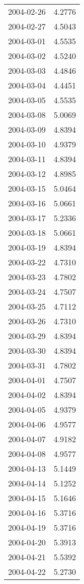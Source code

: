 \begin{tabular}{lr}
2004-02-26 &      4.2776 \\
2004-02-27 &      4.5043 \\
2004-03-01 &      4.5535 \\
2004-03-02 &      4.5240 \\
2004-03-03 &      4.4846 \\
2004-03-04 &      4.4451 \\
2004-03-05 &      4.5535 \\
2004-03-08 &      5.0069 \\
2004-03-09 &      4.8394 \\
2004-03-10 &      4.9379 \\
2004-03-11 &      4.8394 \\
2004-03-12 &      4.8985 \\
2004-03-15 &      5.0464 \\
2004-03-16 &      5.0661 \\
2004-03-17 &      5.2336 \\
2004-03-18 &      5.0661 \\
2004-03-19 &      4.8394 \\
2004-03-22 &      4.7310 \\
2004-03-23 &      4.7802 \\
2004-03-24 &      4.7507 \\
2004-03-25 &      4.7112 \\
2004-03-26 &      4.7310 \\
2004-03-29 &      4.8394 \\
2004-03-30 &      4.8394 \\
2004-03-31 &      4.7802 \\
2004-04-01 &      4.7507 \\
2004-04-02 &      4.8394 \\
2004-04-05 &      4.9379 \\
2004-04-06 &      4.9577 \\
2004-04-07 &      4.9182 \\
2004-04-08 &      4.9577 \\
2004-04-13 &      5.1449 \\
2004-04-14 &      5.1252 \\
2004-04-15 &      5.1646 \\
2004-04-16 &      5.3716 \\
2004-04-19 &      5.3716 \\
2004-04-20 &      5.3913 \\
2004-04-21 &      5.5392 \\
2004-04-22 &      5.2730 \\

\end{tabular}
